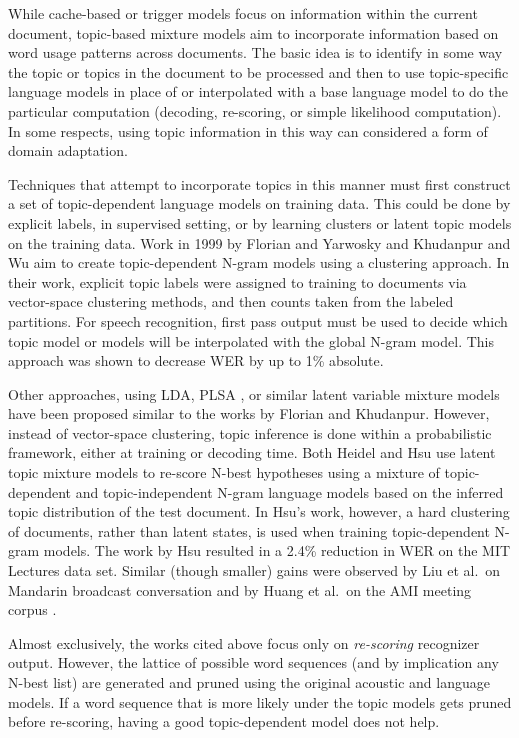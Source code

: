 While cache-based or trigger models focus on information within the current document, topic-based mixture models aim to incorporate information based on word usage patterns across documents.   The basic idea is to identify in some way the topic or topics in the document to be processed and then to use topic-specific language models in place of or interpolated with  a base language model to do the particular computation (decoding, re-scoring, or simple likelihood computation).  In some respects, using topic information in this way can considered a form of domain adaptation.

Techniques that attempt to incorporate topics in this manner must first construct a set of topic-dependent language models on training data. This could be done by explicit labels, in supervised setting, or by learning clusters or latent topic models on the training data.   Work in 1999 by Florian and Yarwosky \cite{florian1999} and Khudanpur and Wu \cite{khudanpur1999} aim to create topic-dependent N-gram models using a clustering approach.  In their work, explicit topic labels were assigned to training to documents via vector-space clustering methods, and then counts taken from the labeled partitions.   For speech recognition, first pass output must be used to decide which topic model or models will be interpolated with the global N-gram model.   This approach was shown to decrease WER by up to 1\% absolute.

Other approaches, using LDA\cite{blei2003latent}, PLSA \cite{hofmann2001}, or similar latent variable mixture models have been proposed similar to the works by Florian and Khudanpur.  However, instead of vector-space clustering, topic inference is done within a probabilistic framework, either at training or decoding time.  Both Heidel \cite{heidel2007language} and Hsu \cite{hsu2006} use latent topic mixture models to re-score N-best hypotheses using a mixture of topic-dependent and topic-independent N-gram language models based on the inferred topic distribution of the test document.  In Hsu's work, however, a hard clustering of documents, rather than latent states, is used when training topic-dependent N-gram models.  The work by Hsu resulted in a 2.4\% reduction in WER on the MIT Lectures data set.  Similar (though smaller) gains were observed by Liu et al.\ on Mandarin broadcast conversation \cite{liu2008} and by Huang et al.\ on the AMI meeting corpus \cite{huang2008unsupervised}.

Almost exclusively, the works cited above focus only on \textit{re-scoring} recognizer output.  However, the lattice of possible word sequences (and by implication any N-best list) are generated and pruned using the original acoustic and language models.  If a word sequence that is more likely under the topic models gets pruned before re-scoring, having a good topic-dependent model does not help.  

